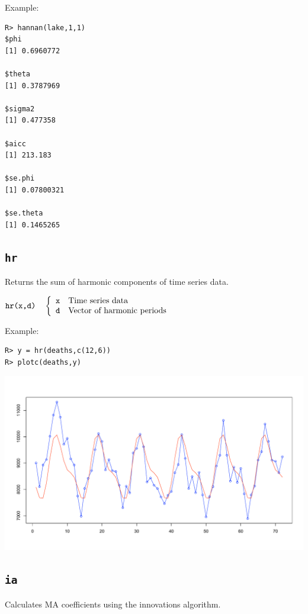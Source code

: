 \documentclass[12pt]{article}
\begin{document}
\noindent
Example:
\begin{verbatim}
R> hannan(lake,1,1)
$phi
[1] 0.6960772

$theta
[1] 0.3787969

$sigma2
[1] 0.477358

$aicc
[1] 213.183

$se.phi
[1] 0.07800321

$se.theta
[1] 0.1465265
\end{verbatim}

\newpage

\subsection{\tt hr}
Returns the sum of harmonic components of time series data.

\bigskip
$
\hbox{\tt hr(x,d)}\quad\left\{\begin{array}{ll}
{\tt x} & \hbox{Time series data}\\
{\tt d} & \hbox{Vector of harmonic periods}
\end{array}\right.
$

\bigskip
\noindent
Example:
\begin{verbatim}
R> y = hr(deaths,c(12,6))
R> plotc(deaths,y)
\end{verbatim}

\begin{center}
\includegraphics[scale=0.3]{Rplot-12.pdf}
\end{center}

\newpage

\subsection{\tt ia}
Calculates MA coefficients using the innovations algorithm.
\end{document}
